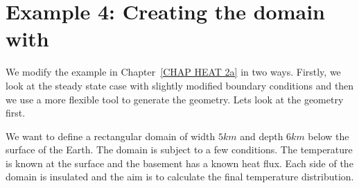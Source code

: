 \section{Example 4: Creating the domain with \pycad}

We modify the example in Chapter~\ref{CHAP HEAT 2a} in two ways. Firstly, we look at the steady state 
case with slightly modified boundary conditions and then we use a more flexible tool 
to generate the geometry. Lets look at the geometry first. 

We want to define a rectangular domain of width $5 km$ and depth $6 km$ below the surface of the Earth. The domain is subject to a few conditions. The temperature is known at the surface and the basement has a known heat flux. Each side of the domain is insulated and the aim is to calculate the final temperature distribution.

